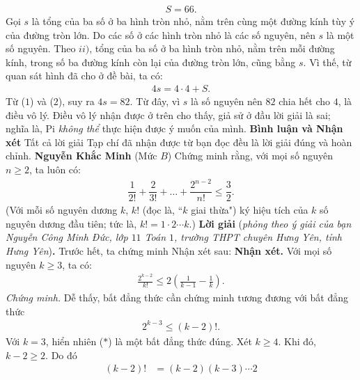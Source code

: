 \begin{multicols}{2}
\begin{align*}
		S = 66. \tag{$1$} 
	\end{align*}
	Gọi $s$ là tổng của ba số ở ba hình tròn nhỏ, nằm trên cùng một đường kính tùy ý của đường tròn lớn. Do các số ở các hình tròn nhỏ là các số nguyên, nên $s$ là một số nguyên.
	\vskip 0.05cm
	Theo $ii)$, tổng của ba số ở ba hình tròn nhỏ, nằm trên mỗi đường kính, trong số ba đường kính còn lại của đường tròn lớn, cũng bằng $s$. Vì thế, từ quan sát hình đã cho ở đề bài, ta có:
	\begin{align*}
		4s = 4 \cdot 4 + S. \tag{$2$}
	\end{align*}
	Từ ($1$) và ($2$), suy ra $4s = 82$. Từ đây, vì $s$ là số nguyên nên $82$ chia hết cho $4$, là điều vô lý.
	\vskip 0.05cm
	Điều vô lý nhận được ở trên cho thấy, giả sử ở đầu lời giải là sai; nghĩa là, Pi \textit{không thể} thực hiện được ý muốn của mình.
	\vskip 0.05cm
	\textbf{\color{thachthuctoanhoc}Bình luận và Nhận xét}
	\vskip 0.05cm
	Tất cả lời giải Tạp chí đã nhận được từ bạn đọc đều là lời giải đúng và hoàn chỉnh.
	\vskip 0.15cm
	\hfill	\textbf{\color{thachthuctoanhoc}Nguyễn Khắc Minh}
	\vskip 0.15cm
	{}
	(Mức $B$) Chứng minh rằng, với mọi số nguyên $n\ge2$, ta luôn có:
	\begin{align*}
		\dfrac{1}{2!}+\dfrac{2}{3!}+\ldots+\dfrac{2^{n-2}}{n!}\le\dfrac{3}{2}.
	\end{align*}
	(Với mỗi số nguyên dương $k$, $k!$ (đọc là, ``$k$ giai thừa") ký hiệu tích của $k$ số nguyên dương đầu tiên; tức là, $k!=1\cdot2\cdots k$.)
	\vskip 0.05cm
	\textbf{\color{thachthuctoanhoc}Lời giải} (\textit{phỏng theo ý giải của bạn Nguyễn Công Minh Đức, lớp $11$ Toán $1$, trường THPT chuyên Hưng Yên, tỉnh Hưng Yên})\textbf{\color{thachthuctoanhoc}.}
	\vskip 0.05cm
	Trước hết, ta chứng minh Nhận xét sau:
	\vskip 0.05cm
	\textbf{\color{thachthuctoanhoc}Nhận xét.} Với mọi số nguyên $k \ge 3$, ta có:
	\begin{align*}
		\frac{{{2^{k - 2}}}}{{k!}} \le 2\left( {\frac{1}{{k - 1}} - \frac{1}{k}} \right).
	\end{align*}
	\textit{Chứng minh.} Dễ thấy, bất đẳng thức cần chứng minh tương đương với bất đẳng thức
	\begin{align*}
		{2^{k - 3}} \le \left( {k - 2} \right)!. \tag{$*$}
	\end{align*}
	Với $k = 3$, hiển nhiên ($*$) là một bất đẳng thức đúng.
	\vskip 0.05cm
	Xét $k \ge 4$. Khi đó, $k - 2 \ge 2$. Do đó
	\begin{align*}
		\left( {k - 2} \right)! &= \left( {k - 2} \right)\left( {k - 3} \right) \cdots 2 \\

\end{align*}
\end{multicols}

